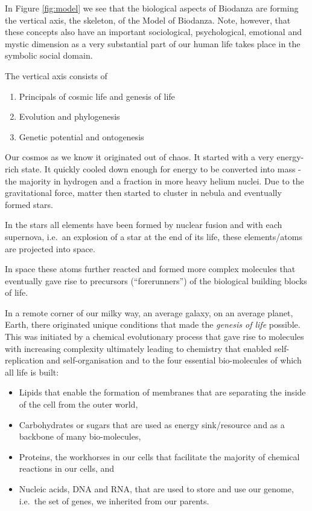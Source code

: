 \documentclass[
  11pt,
]{book}
\providecommand{\tightlist}{%
  \setlength{\itemsep}{0pt}\setlength{\parskip}{0pt}}
\begin{document}
In Figure \ref{fig:model} we see that the biological aspects of Biodanza are forming the vertical axis, the skeleton, of the Model of Biodanza. Note, however, that these concepts also have an important sociological, psychological, emotional and mystic dimension as a very substantial part of our human life takes place in the symbolic social domain.

The vertical axis consists of

\begin{enumerate}
\def\labelenumi{\arabic{enumi}.}
\tightlist
\item
  Principals of cosmic life and genesis of life
\item
  Evolution and phylogenesis
\item
  Genetic potential and ontogenesis
\end{enumerate}

Our cosmos as we know it originated out of chaos. It started with a very energy-rich state. It quickly cooled down enough for energy to be converted into mass - the majority in hydrogen and a fraction in more heavy helium nuclei. Due to the gravitational force, matter then started to cluster in nebula and eventually formed stars.

In the stars all elements have been formed by nuclear fusion and with each supernova, i.e.~an explosion of a star at the end of its life, these elements/atoms are projected into space.

In space these atoms further reacted and formed more complex molecules that eventually gave rise to precursors (``forerunners'') of the biological building blocks of life.

In a remote corner of our milky way, an average galaxy, on an average planet, Earth, there originated unique conditions that made the \emph{genesis of life} possible.
This was initiated by a chemical evolutionary process that gave rise to molecules with increasing complexity ultimately leading to chemistry that enabled self-replication and self-organisation and to the four essential bio-molecules of which all life is built:

\begin{itemize}
\tightlist
\item
  Lipids that enable the formation of membranes that are separating the inside of the cell from the outer world,
\item
  Carbohydrates or sugars that are used as energy sink/resource and as a backbone of many bio-molecules,
\item
  Proteins, the workhorses in our cells that facilitate the majority of chemical reactions in our cells, and
\item
  Nucleic acids, DNA and RNA, that are used to store and use our genome, i.e.~the set of genes, we inherited from our parents.
\end{itemize}
\end{document}
